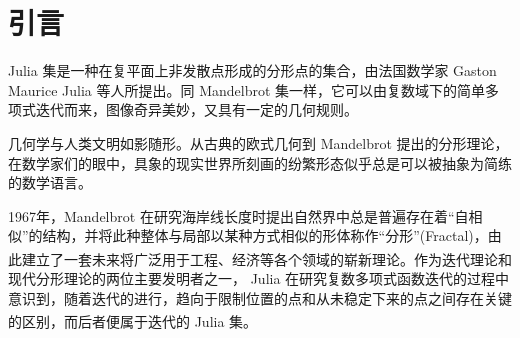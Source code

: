 \section{引言}

Julia 集是一种在复平面上非发散点形成的分形点的集合，由法国数学家 Gaston Maurice Julia 等人所提出。同 Mandelbrot 集一样，它可以由复数域下的简单多项式迭代而来，图像奇异美妙，又具有一定的几何规则。

几何学与人类文明如影随形。从古典的欧式几何到 Mandelbrot 提出的分形理论，在数学家们的眼中，具象的现实世界所刻画的纷繁形态似乎总是可以被抽象为简练的数学语言。

1967年，Mandelbrot 在研究海岸线长度时提出自然界中总是普遍存在着“自相似”的结构，并将此种整体与局部以某种方式相似的形体称作“分形”(Fractal)，由此建立了一套未来将广泛用于工程、经济等各个领域的崭新理论。\textsuperscript{\cite{enwiki-mandelbortset}}作为迭代理论和现代分形理论的两位主要发明者之一， Julia 在研究复数多项式函数迭代的过程中意识到，随着迭代的进行，趋向于限制位置的点和从未稳定下来的点之间存在关键的区别，而后者便属于迭代的 Julia 集。\textsuperscript{\cite{website-julia}}

